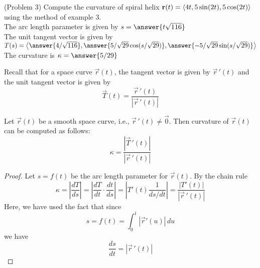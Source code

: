 \documentclass[handout]{ximera}
\begin{document}
\begin{problem}(Problem 3)
Compute the curvature of spiral helix $\mathbf r(t) = \left\langle 4t, 5 \sin(2t),5\cos(2t)\right\rangle$ using the method of example 3.\\
The arc length parameter is given by $s = \answer{t\sqrt{116}}$\\
The unit tangent vector is given by $T(s) = \vector{\answer{4/\sqrt{116}}, \answer{5/\sqrt{29} \cos(s/\sqrt{29})}, \answer{-5/\sqrt{29} \sin(s/\sqrt{29})}}$\\
The curvature is $\kappa = \answer{5/29}$
\end{problem}

Recall that for a space curve $\vec r(t)$, the tangent vector is given by $\vec r\,'(t)$ and the unit tangent vector is given by
\[
\vec T(t) = \frac{\vec r\,'(t)}{|\vec r\,'(t)|}
\]

\begin{proposition}
Let $\vec r(t)$ be a smooth space curve, i.e., $\vec r\,'(t) \neq \vec 0$. Then curvature of $\vec r(t)$ can be computed as follows:
\[
\kappa = \frac{|\vec T\,'(t)|}{|\vec r\,'(t)|}
\]
\end{proposition}
\begin{proof}
Let $s = f(t)$ be the arc length parameter for $\vec r(t)$. By the chain rule
\[
\kappa = \left|\frac{dT}{ds}\right| = \left|\frac{dT}{dt} \cdot \frac{dt}{ds}\right| = \left|T'(t) \frac{1}{ds/dt}\right| = \frac{|T'(t)|}{|\vec r\,'(t)|}
\]
Here, we have used the fact that since
\[
s = f(t) = \int_0^t |\vec r'(u)| \, du
\]
we have
\[
\frac{ds}{dt} = |\vec r\,'(t)|
\]
\end{proof}
\end{document}
